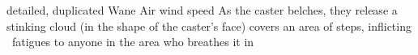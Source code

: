   {detailed, duplicated}%
  {Wane}%
  {Air}%
  {wind speed}%
  {As the caster belches, they release a stinking cloud (in the shape of the caster's face) covers an area of  \glspl{step}, inflicting ~\glspl{fatigue} to anyone in the area who breathes it in}%
  {}
